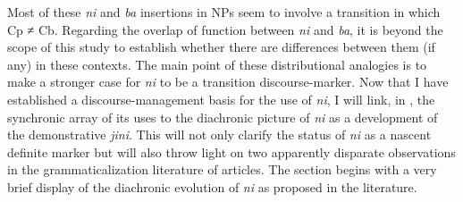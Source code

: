\documentclass[output=paper
,modfonts
,nonflat]{langsci/langscibook}
\begin{document}
\largerpage[2] Most of these \textit{ni} and \textit{ba} insertions in NPs seem to involve a transition in which Cp ≠ Cb.
Regarding the overlap of function between \textit{ni} and \textit{ba}, it is beyond the scope of this study to establish whether there are differences between them (if any) in these contexts. 
The main point of these distributional analogies is to make a stronger case for \textit{ni} to be a transition discourse-marker.
Now that I have established a discourse-management basis for the use of \textit{ni}, I will link, in , the synchronic array of its uses to the diachronic picture of \textit{ni} as a development of the demonstrative \textit{jini}. This will not only clarify the status of \textit{ni} as a nascent definite marker but will also throw light on two apparently disparate observations in the grammaticalization literature of articles. The section begins with a very brief display of the diachronic evolution of \textit{ni} as proposed in the literature.\pagebreak
\end{document}
